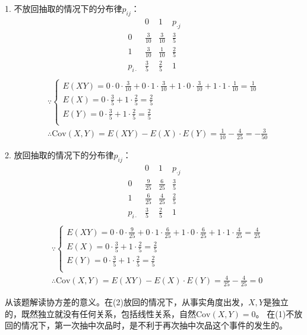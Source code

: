 1. 不放回抽取的情况下的分布律$p_{ij}$：
\[
\begin{matrix}
	&		0&		1&		p_{\cdot j}\\
	0&		\frac{3}{10}&		\frac{3}{10}&		\frac{3}{5}\\
	1&		\frac{3}{10}&		\frac{1}{10}&		\frac{2}{5}\\
	p_{i\cdot}&		\frac{3}{5}&		\frac{2}{5}&		1\\
\end{matrix}
\]
\begin{align*}
&\because \begin{cases}
	E\left( XY \right) =0\cdot 0\cdot \frac{3}{10}+0\cdot 1\cdot \frac{3}{10}+1\cdot 0\cdot \frac{3}{10}+1\cdot 1\cdot \frac{1}{10}=\frac{1}{10}\\
	E\left( X \right) =0\cdot \frac{3}{5}+1\cdot \frac{2}{5}=\frac{2}{5}\\
	E\left( Y \right) =0\cdot \frac{3}{5}+1\cdot \frac{2}{5}=\frac{2}{5}\\
\end{cases} \\
&\therefore \mathrm{Cov}\left( X,Y \right) =E\left( XY \right) -E\left( X \right) \cdot E\left( Y \right) =\frac{1}{10}-\frac{4}{25}=-\frac{3}{50}
\end{align*}

2. 放回抽取的情况下的分布律$p_{ij}$：
\[
\begin{matrix}
	&		0&		1&		p_{\cdot j}\\
	0&		\frac{9}{25}&		\frac{6}{25}&		\frac{3}{5}\\
	1&		\frac{6}{25}&		\frac{4}{25}&		\frac{2}{5}\\
	p_{i\cdot}&		\frac{3}{5}&		\frac{2}{5}&		1\\
\end{matrix}
\]
\begin{align*}
&\because \begin{cases}
	E\left( XY \right) =0\cdot 0\cdot \frac{9}{25}+0\cdot 1\cdot \frac{6}{25}+1\cdot 0\cdot \frac{6}{25}+1\cdot 1\cdot \frac{4}{25}=\frac{4}{25}\\
	E\left( X \right) =0\cdot \frac{3}{5}+1\cdot \frac{2}{5}=\frac{2}{5}\\
	E\left( Y \right) =0\cdot \frac{3}{5}+1\cdot \frac{2}{5}=\frac{2}{5}\\
\end{cases} \\
&\therefore \mathrm{Cov}\left( X,Y \right) =E\left( XY \right) -E\left( X \right) \cdot E\left( Y \right) =\frac{4}{25}-\frac{4}{25}=0
\end{align*}

\begin{tcolorbox}
从该题解读协方差的意义。在(2)放回的情况下，从事实角度出发，$X,Y$是独立的，既然独立就没有任何关系，包括线性关系，自然$\mathrm{Cov}\left( X,Y \right) =0$。
在(1)不放回的情况下，第一次抽中次品时，是不利于再次抽中次品这个事件的发生的。
\end{tcolorbox}




